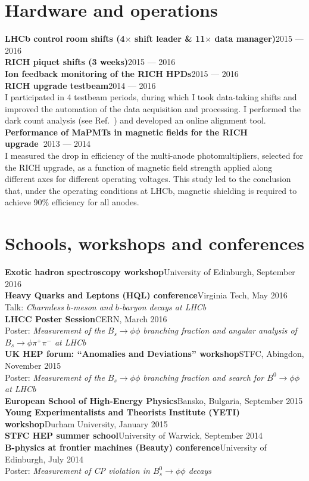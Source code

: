 \documentclass[contbibnum,titleabove]{simplecv}
\newcommand\dateditem[2]{#1\hfill#2\\}
\newcommand\topictitle[3]{\dateditem{{\textbf{#1}}}{#3}#2}
\begin{document}
	\section{Hardware and operations}
	\vspace{-0.5em}
	\topictitle{LHCb control room shifts (4$\times$ shift leader \& 11$\times$ data manager)}{}{2015 --- 2016}
	\topictitle{RICH piquet shifts (3 weeks)}{}{2015 --- 2016}
	\topictitle{Ion feedback monitoring of the RICH HPDs}{}{2015 --- 2016}
	\topictitle{RICH upgrade testbeam}{}{2014 --- 2016}
	I participated in 4 testbeam periods, during which I took data-taking shifts and improved the automation of the data acquisition and processing. I performed the dark count analysis (see Ref.~\cite{testbeam}) and developed an online alignment tool.\\
	\topictitle{Performance of MaPMTs in magnetic fields for the RICH upgrade~\cite{mapmt}}{}{2013 --- 2014}
	I measured the drop in efficiency of the multi-anode photomultipliers, selected for the RICH upgrade, as a function of magnetic field strength applied along different axes for different operating voltages.
	This study led to the conclusion that, under the operating conditions at LHCb, magnetic shielding is required to achieve 90\% efficiency for all anodes.\\[-2.5em]
	\section{Schools, workshops and conferences}
	\vspace{-0.5em}
	\topictitle{Exotic hadron spectroscopy workshop}{}{University of Edinburgh, September 2016}[0.5em]
	\topictitle{Heavy Quarks and Leptons (HQL) conference}{Talk: \textit{Charmless $b$-meson and $b$-baryon decays at LHCb}~\cite{HQL}}{Virginia Tech, May 2016}\\[0.5em]
	\topictitle{LHCC Poster Session}{Poster: \textit{Measurement of the $B_s \to \phi \phi$ branching fraction and angular analysis of $B_s \to \phi \pi^{+} \pi^{-}$ at LHCb}}{CERN, March 2016}\\[0.5em]
	\topictitle{UK HEP forum: ``Anomalies and Deviations'' workshop}{Poster: \textit{Measurement of the $B_s \to \phi \phi$ branching fraction and search for $B^0 \to \phi \phi$ at LHCb}}{STFC, Abingdon, November 2015}\\[0.5em]
	\topictitle{European School of High-Energy Physics}{}{Bansko, Bulgaria, September 2015}[0.5em]
	\topictitle{Young Experimentalists and Theorists Institute (YETI) workshop}{}{Durham University, January 2015}[0.5em]
	\topictitle{STFC HEP summer school}{}{University of Warwick, September 2014}[0.5em]
	\topictitle{B-physics at frontier machines (Beauty) conference}{Poster: \textit{Measurement of CP violation in $B^0_s \to \phi\phi$ decays~\cite{beauty}}}{University of Edinburgh, July 2014}\\[-2.5em]
\end{document}
